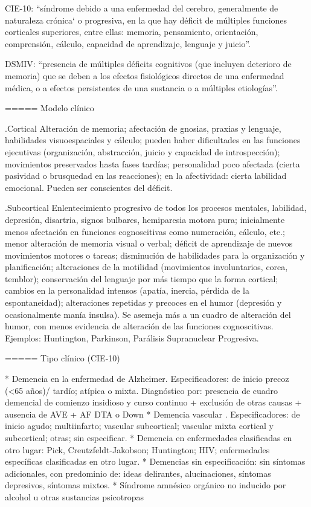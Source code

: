 CIE-10: “síndrome debido a una enfermedad del cerebro, generalmente de naturaleza crónica` o progresiva, en la que hay déficit de múltiples funciones corticales superiores, entre ellas: memoria, pensamiento, orientación, comprensión, cálculo, capacidad de aprendizaje, lenguaje y juicio”.

DSMIV: “presencia de múltiples déficits cognitivos (que incluyen deterioro de memoria) que se deben a los efectos fisiológicos directos de una enfermedad médica, o a efectos persistentes de una sustancia o a múltiples etiologías”.

===== Modelo clínico

.Cortical
Alteración de memoria; afectación de gnosias, praxias y lenguaje, habilidades visuoespaciales y cálculo; pueden haber dificultades en las funciones ejecutivas (organización, abstracción, juicio y capacidad de introspección); movimientos preservados hasta fases tardías; personalidad poco afectada (cierta pasividad o brusquedad en las reacciones); en la afectividad: cierta labilidad emocional. Pueden ser conscientes del déficit.

.Subcortical
Enlentecimiento progresivo de todos los procesos mentales, labilidad, depresión, disartria, signos bulbares, hemiparesia motora pura; inicialmente menos afectación en funciones cognoscitivas como numeración, cálculo, etc.; menor alteración de memoria visual o verbal; déficit de aprendizaje de nuevos movimientos motores o tareas; disminución de habilidades para la organización y planificación; alteraciones de la motilidad (movimientos involuntarios, corea, temblor); conservación del lenguaje por más tiempo que la forma cortical; cambios en la personalidad intensos (apatía, inercia, pérdida de la espontaneidad); alteraciones repetidas y precoces en el humor (depresión y ocasionalmente manía insulsa). Se asemeja más a un cuadro de alteración del humor, con menos evidencia de alteración de las funciones cognoscitivas. Ejemplos: Huntington, Parkinson, Parálisis Supranuclear Progresiva.

===== Tipo clínico (CIE-10)

* Demencia en la enfermedad de Alzheimer. Especificadores: de inicio precoz (<65 años)/ tardío; atípica o mixta. Diagnóstico por: presencia de cuadro demencial de comienzo insidioso y curso continuo + exclusión de otras causas + ausencia de AVE + AF DTA o Down
* Demencia vascular . Especificadores: de inicio agudo; multiinfarto; vascular subcortical; vascular mixta cortical y subcortical; otras; sin especificar.
* Demencia en enfermedades clasificadas en otro lugar: Pick, Creutzfeldt-Jakobson; Huntington; HIV; enfermedades específicas clasificadas en otro lugar.
* Demencias sin especificación: sin síntomas adicionales, con predominio de: ideas delirantes, alucinaciones, síntomas depresivos, síntomas mixtos.
* Síndrome amnésico orgánico no inducido por alcohol u otras sustancias psicotropas

